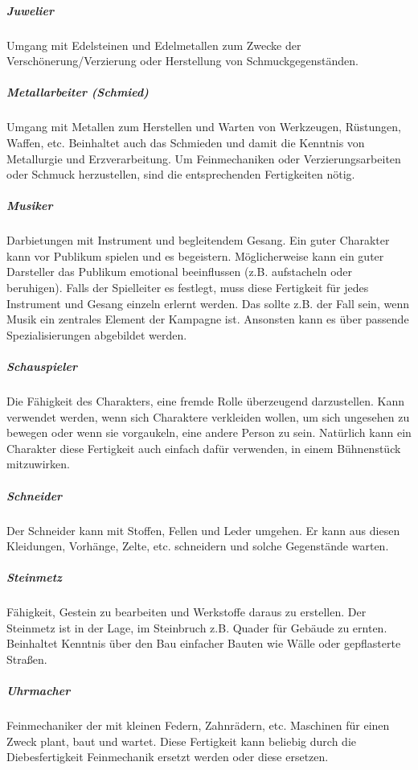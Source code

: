 \documentclass{article}
\begin{document}
\subparagraph{Juwelier}

Umgang mit Edelsteinen und Edelmetallen zum Zwecke der Verschönerung/Verzierung oder Herstellung von
Schmuckgegenständen.

\subparagraph{Metallarbeiter (Schmied)}

Umgang mit Metallen zum Herstellen und Warten von Werkzeugen, Rüstungen, Waffen, etc. Beinhaltet auch das Schmieden
und damit die Kenntnis von Metallurgie und Erzverarbeitung. Um Feinmechaniken oder Verzierungsarbeiten oder Schmuck
herzustellen, sind die entsprechenden Fertigkeiten nötig.

\subparagraph{Musiker}

Darbietungen mit Instrument und begleitendem Gesang. Ein guter Charakter kann vor Publikum spielen und es
begeistern. Möglicherweise kann ein guter Darsteller das Publikum emotional beeinflussen (z.B. aufstacheln oder
beruhigen). Falls der Spielleiter es festlegt, muss diese Fertigkeit für jedes Instrument und Gesang einzeln erlernt
werden. Das sollte z.B. der Fall sein, wenn Musik ein zentrales Element der Kampagne ist. Ansonsten kann es über
passende Spezialisierungen abgebildet werden.

\subparagraph{Schauspieler}

Die Fähigkeit des Charakters, eine fremde Rolle überzeugend darzustellen. Kann verwendet werden, wenn sich Charaktere
verkleiden wollen, um sich ungesehen zu bewegen oder wenn sie vorgaukeln, eine andere Person zu sein. Natürlich kann
ein Charakter diese Fertigkeit auch einfach dafür verwenden, in einem Bühnenstück mitzuwirken.

\subparagraph{Schneider}

Der Schneider kann mit Stoffen, Fellen und Leder umgehen. Er kann aus diesen Kleidungen, Vorhänge, Zelte, etc.
schneidern und solche Gegenstände warten.

\subparagraph{Steinmetz}

Fähigkeit, Gestein zu bearbeiten und Werkstoffe daraus zu erstellen. Der Steinmetz ist in der Lage, im Steinbruch z.B.
Quader für Gebäude zu ernten. Beinhaltet Kenntnis über den Bau einfacher Bauten wie Wälle oder gepflasterte
Straßen.

\subparagraph{Uhrmacher}

Feinmechaniker der mit kleinen Federn, Zahnrädern, etc. Maschinen für einen Zweck plant, baut und wartet. Diese
Fertigkeit kann beliebig durch die Diebesfertigkeit Feinmechanik ersetzt werden oder diese ersetzen.
\end{document}
